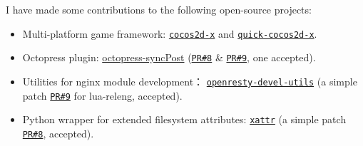 \documentclass[letterpaper]{article}
\begin{document}
\begin{itemize}
\end{itemize}

I have made some contributions to the following open-source projects:
\begin{itemize}
    \item Multi-platform game framework: \href{https://github.com/cocos2d/cocos2d-x}{\tt cocos2d-x} and \href{https://github.com/dualface/v3quick}{\tt quick-cocos2d-x}.
    \item Octopress plugin: \href{https://github.com/huangbowen521/octopress-syncPost}{octopress-syncPost} (\href{https://github.com/huangbowen521/octopress-syncPost/pull/8}{\tt PR\#8} \& \href{https://github.com/huangbowen521/octopress-syncPost/pull/9}{\tt PR\#9}, one accepted).
    \item Utilities for nginx module development： \href{https://github.com/openresty/openresty-devel-utils}{\tt openresty-devel-utils} (a simple patch \href{https://github.com/openresty/openresty-devel-utils/pull/9}{\tt PR\#9} for lua-releng, accepted).
    \item Python wrapper for extended filesystem attributes: \href{https://github.com/xattr/xattr}{\tt xattr} (a simple patch \href{https://github.com/xattr/xattr/issues/8}{\tt PR\#8}, accepted).
\end{itemize}

\end{document}
